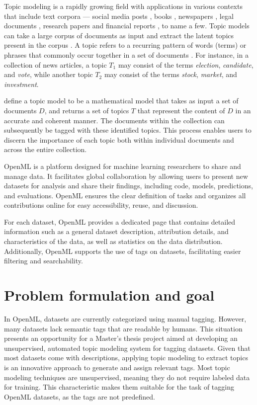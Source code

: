 Topic modeling is a rapidly growing field with applications in various contexts that include text corpora — social media posts \cite{curiskis_evaluation_2020,paul_discovering_2014,pennacchiotti_investigating_2011}, books \cite{raj_p_m_sentiment_2022}, newspapers \cite{jacobi_quantitative_2018,nicholson_search_2020,marjanen_topic_2020}, legal documents \cite{silveira_topic_nodate,oneill_analysis_2016}, research papers \cite{asmussen_smart_2019} and financial reports \cite{el_mokhtari_using_2020,garcia-mendez_automatic_2023}, to name a few. Topic models can take a large corpus of documents as input and extract the latent topics present in the corpus \cite{blei_latent_2001}. A topic refers to a recurring pattern of words (terms) or phrases that commonly occur together in a set of documents \cite{abdelrazek_topic_2022}. For instance, in a collection of news articles, a topic $T_1$ may consist of the terms \textit{election}, \textit{candidate}, and \textit{vote}, while another topic $T_2$ may consist of the terms \textit{stock}, \textit{market}, and \textit{investment}.

\citet{churchill_evolution_2022} define a topic model to be a mathematical model that takes as input a set of documents $D$, and returns a set of topics $T$ that represent the content of $D$ in an accurate and coherent manner. The documents within the collection can subsequently be tagged with these identified topics. This process enables users to discern the importance of each topic both within individual documents and across the entire collection.

OpenML \cite{vanschoren_openml_2014} is a platform designed for machine learning researchers to share and manage data. It facilitates global collaboration by allowing users to present new datasets for analysis and share their findings, including code, models, predictions, and evaluations. OpenML ensures the clear definition of tasks and organizes all contributions online for easy accessibility, reuse, and discussion.

For each dataset, OpenML provides a dedicated page that contains detailed information such as a general dataset description, attribution details, and characteristics of the data, as well as statistics on the data distribution. Additionally, OpenML supports the use of tags on datasets, facilitating easier filtering and searchability.

\section{Problem formulation and goal}
In OpenML, datasets are currently categorized using manual tagging. However, many datasets lack semantic tags that are readable by humans. This situation presents an opportunity for a Master's thesis project aimed at developing an unsupervised, automated topic modeling system for tagging datasets. Given that most datasets come with descriptions, applying topic modeling to extract topics is an innovative approach to generate and assign relevant tags. Most topic modeling techniques are unsupervised, meaning they do not require labeled data for training. This characteristic makes them suitable for the task of tagging OpenML datasets, as the tags are not predefined.

